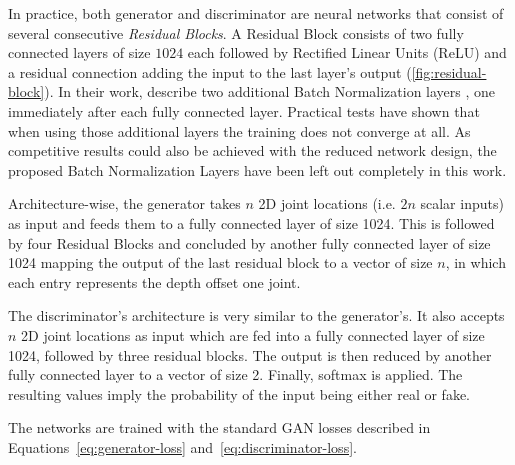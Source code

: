 In practice, both generator and discriminator are neural networks that consist of several consecutive \textit{Residual Blocks}.
A Residual Block consists of two fully connected layers of size $1024$ each followed by Rectified Linear Units (ReLU) and a residual connection adding the input to the last layer's output (\autoref{fig:residual-block}).
In their work, \citet{drover18} describe two additional Batch Normalization layers \cite{ioffe15}, one immediately after each fully connected layer.
Practical tests have shown that when using those additional layers the training does not converge at all.
As competitive results could also be achieved with the reduced network design, the proposed Batch Normalization Layers have been left out completely in this work.

Architecture-wise, the generator takes $n$ 2D joint locations (i.e. $2n$ scalar inputs) as input and feeds them to a fully connected layer of size 1024.
This is followed by four Residual Blocks and concluded by another fully connected layer of size 1024 mapping the output of the last residual block to a vector of size $n$, in which each entry represents the depth offset one joint.

The discriminator's architecture is very similar to the generator's. 
It also accepts $n$ 2D joint locations as input which are fed into a fully connected layer of size 1024, followed by three residual blocks.
The output is then reduced by another fully connected layer to a vector of size 2.
Finally, softmax is applied.
The resulting values imply the probability of the input being either real or fake.

The networks are trained with the standard GAN losses described in Equations~\ref{eq:generator-loss} and~\ref{eq:discriminator-loss}.